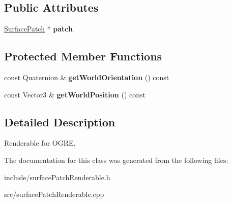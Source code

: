 \subsection*{\-Public \-Attributes}
\begin{DoxyCompactItemize}
\item 
\hypertarget{classSurfacePatchRenderable_a17af1c77f28c42e89e258ea5881bd7e1}{
\hyperlink{classSurfacePatch}{\-Surface\-Patch} $\ast$ {\bfseries patch}}
\label{d3/d05/classSurfacePatchRenderable_a17af1c77f28c42e89e258ea5881bd7e1}

\end{DoxyCompactItemize}
\subsection*{\-Protected \-Member \-Functions}
\begin{DoxyCompactItemize}
\item 
\hypertarget{classSurfacePatchRenderable_acc53a4b15cf2400807b0e27675bc885a}{
const \-Quaternion \& {\bfseries get\-World\-Orientation} () const }
\label{d3/d05/classSurfacePatchRenderable_acc53a4b15cf2400807b0e27675bc885a}

\item 
\hypertarget{classSurfacePatchRenderable_ad658d023974198ee28f8be284ce3da24}{
const \-Vector3 \& {\bfseries get\-World\-Position} () const }
\label{d3/d05/classSurfacePatchRenderable_ad658d023974198ee28f8be284ce3da24}

\end{DoxyCompactItemize}


\subsection{\-Detailed \-Description}
\-Renderable for \-O\-G\-R\-E. 

\-The documentation for this class was generated from the following files\-:\begin{DoxyCompactItemize}
\item 
include/surface\-Patch\-Renderable.\-h\item 
src/surface\-Patch\-Renderable.\-cpp\end{DoxyCompactItemize}

